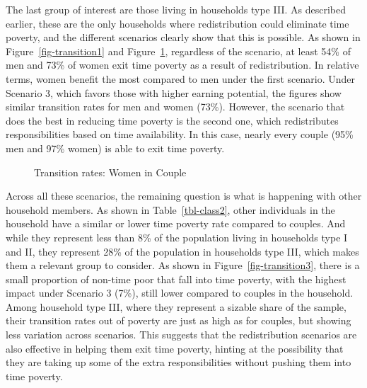 \documentclass[
  11pt,
]{article}
\begin{document}
The last group of interest are those living in households type III. As
described earlier, these are the only households where redistribution
could eliminate time poverty, and the different scenarios clearly show
that this is possible. As shown in Figure~\ref{fig-transition1} and
Figure~\ref{fig-transition2}, regardless of the scenario, at least 54\%
of men and 73\% of women exit time poverty as a result of
redistribution. In relative terms, women benefit the most compared to
men under the first scenario. Under Scenario 3, which favors those with
higher earning potential, the figures show similar transition rates for
men and women (73\%). However, the scenario that does the best in
reducing time poverty is the second one, which redistributes
responsibilities based on time availability. In this case, nearly every
couple (95\% men and 97\% women) is able to exit time poverty.

\begin{figure}[H]


\caption{\label{fig-transition2}Transition rates: Women in Couple}

\end{figure}%

Across all these scenarios, the remaining question is what is happening
with other household members. As shown in Table~\ref{tbl-class2}, other
individuals in the household have a similar or lower time poverty rate
compared to couples. And while they represent less than 8\% of the
population living in households type I and II, they represent 28\% of
the population in households type III, which makes them a relevant group
to consider. As shown in Figure~\ref{fig-transition3}, there is a small
proportion of non-time poor that fall into time poverty, with the
highest impact under Scenario 3 (7\%), still lower compared to couples
in the household. Among household type III, where they represent a
sizable share of the sample, their transition rates out of poverty are
just as high as for couples, but showing less variation across
scenarios. This suggests that the redistribution scenarios are also
effective in helping them exit time poverty, hinting at the possibility
that they are taking up some of the extra responsibilities without
pushing them into time poverty.
\end{document}
